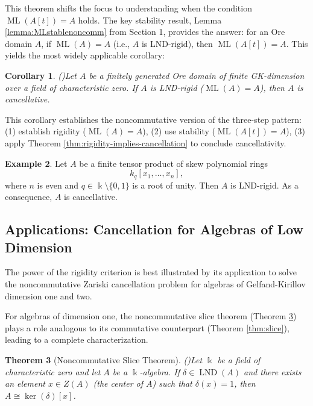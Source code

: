 \documentclass{amsart}
\theoremstyle{plain}
\newtheorem{theorem}{Theorem}
\newtheorem{corollary}[theorem]{Corollary}
\numberwithin{theorem}{section}
\numberwithin{equation}{theorem}
\theoremstyle{definition}
\newtheorem{example}[theorem]{Example}
\DeclareMathOperator{\LND}{LND}
\DeclareMathOperator{\ML}{ML}
\begin{document}
This theorem shifts the focus to understanding when the condition $\ML(A[t]) = A$ holds. The key stability result, Lemma \ref{lemma:MLstablenoncomm} from Section 1, provides the answer: for an Ore domain $A$, if $\ML(A)=A$ (i.e., $A$ is LND-rigid), then $\ML(A[t])=A$. This yields the most widely applicable corollary:

\begin{corollary}(\cite[Theorem 3.6]{BellZhang2017})\label{cor:rigidity-criterion-nc}
Let $A$ be a finitely generated Ore domain of finite GK-dimension over a field of characteristic zero. If $A$ is LND-rigid ($\ML(A)=A$), then $A$ is cancellative.
\end{corollary}

This corollary establishes the noncommutative version of the three-step pattern: (1) establish rigidity ($\ML(A)=A$), (2) use stability ($\ML(A[t])=A$), (3) apply Theorem \ref{thm:rigidity-implies-cancellation} to conclude cancellativity.

\begin{example}\cite[Theorem~0.8]{BellZhang2017}
\label{ex:skew-lnd-rigid}
Let $A$ be a finite tensor product of skew polynomial rings
\[
k_{q}[x_1,\dots,x_n],
\]
where $n$ is even and $q \in\Bbbk\setminus  \{0,1\}$ is a root of unity.
Then $A$ is LND-rigid. As a consequence, $A$ is cancellative.
\end{example}


\subsection{Applications: Cancellation for Algebras of Low Dimension}

The power of the rigidity criterion is best illustrated by its application to solve the noncommutative Zariski cancellation problem for algebras of Gelfand-Kirillov dimension one and two.

For algebras of dimension one, the noncommutative slice theorem (Theorem \ref{thm:noncomm-slice}) plays a role analogous to its commutative counterpart (Theorem \ref{thm:slice}), leading to a complete characterization.

\begin{theorem}[Noncommutative Slice Theorem] (\cite[Lemma 3.1]{BHHV})\label{thm:noncomm-slice}
Let $\Bbbk$ be a field of characteristic zero and let $A$ be a $\Bbbk$-algebra. If $\delta \in \LND(A)$ and there exists an element $x \in Z(A)$ (the center of $A$) such that $\delta(x)=1$, then $A \cong \ker(\delta)[x]$.
\end{theorem}
\end{document}
